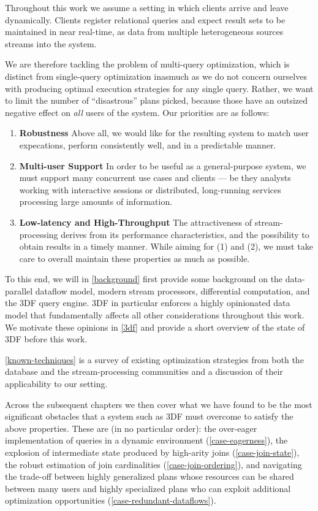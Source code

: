 \documentclass[../index.tex]{subfiles}
\begin{document}
Throughout this work we assume a setting in which clients arrive and
leave dynamically. Clients register relational queries and expect
result sets to be maintained in near real-time, as data from multiple
heterogeneous sources streams into the system.

We are therefore tackling the problem of multi-query optimization,
which is distinct from single-query optimization inasmuch as we do not
concern ourselves with producing optimal execution strategies for any
single query. Rather, we want to limit the number of ``disastrous''
plans picked, because those have an outsized negative effect on
\emph{all} users of the system. Our priorities are as follows:

\begin{enumerate}
  \item \textbf{Robustness} Above all, we would like for the resulting
    system to match user expecations, perform consistently well, and
    in a predictable manner.

  \item \textbf{Multi-user Support} In order to be useful as a
    general-purpose system, we must support many concurrent use cases
    and clients — be they analysts working with interactive sessions
    or distributed, long-running services processing large amounts of
    information.

  \item \textbf{Low-latency and High-Throughput} The attractiveness of
    stream-processing derives from its performance characteristics,
    and the possibility to obtain results in a timely manner. While
    aiming for (1) and (2), we must take care to overall maintain
    these properties as much as possible.
\end{enumerate}

To this end, we will in \autoref{background} first provide some
background on the data-parallel dataflow model, modern stream
processors, differential computation, and the 3DF query engine. 3DF in
particular enforces a highly opinionated data model that fundamentally
affects all other considerations throughout this work. We motivate
these opinions in \autoref{3df} and provide a short overview of the
state of 3DF before this work.

\autoref{known-techniques} is a survey of existing optimization
strategies from both the database and the stream-processing
communities and a discussion of their applicability to our setting.

Across the subsequent chapters we then cover what we have found to be
the most significant obstacles that a system such as 3DF must overcome
to satisfy the above properties. These are (in no particular order):
the over-eager implementation of queries in a dynamic environment
(\autoref{case-eagerness}), the explosion of intermediate state
produced by high-arity joins (\autoref{case-join-state}), the robust
estimation of join cardinalities (\autoref{case-join-ordering}), and
navigating the trade-off between highly generalized plans whose
resources can be shared between many users and highly specialized
plans who can exploit additional optimization opportunities
(\autoref{case-redundant-dataflows}).
\end{document}
